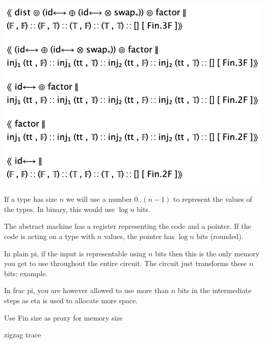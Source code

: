 \documentclass[sigplan,10pt,review,anonymous]{acmart}
\begin{document}
\includegraphics[scale=0.4]{trace1.png}

\PIFMEMsize{}

If a type has size $n$ we will use a number $0..(n-1)$ to represent
the values of the types. In binary, this would use $\log{n}$ bits.

The abstract machine has a register representing the code and a
pointer. If the code is acting on a type with $n$ values, the pointer
has $\log{n}$ bits (rounded).

In plain pi, if the input is representable using $n$ bits then this is
the only memory you get to use throughout the entire circuit. The
circuit just transforms these $n$ bits; example.

In frac pi, you are however allowed to use more than $n$ bits in the
intermediate steps as eta is used to allocate more space.

Use Fin size as proxy for memory size

zigzag trace
\end{document}
